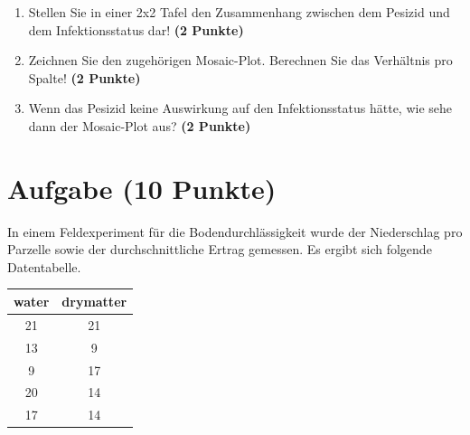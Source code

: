 \documentclass[a4paper, 10pt]{scrartcl}\usepackage[]{graphicx}\usepackage[]{xcolor}
\begin{document}
\begin{enumerate}
\item Stellen Sie in einer 2x2 Tafel den Zusammenhang zwischen dem
  Pesizid und dem Infektionsstatus dar! \textbf{(2 Punkte)}
\item Zeichnen Sie den zugeh{\"o}rigen Mosaic-Plot. Berechnen Sie das
  Verh{\"a}ltnis pro Spalte! \textbf{(2 Punkte)}
\item Wenn das Pesizid keine Auswirkung auf den Infektionsstatus h{\"a}tte, wie
  sehe dann der Mosaic-Plot aus? \textbf{(2 Punkte)}
\end{enumerate} 
\clearpage

\section{Aufgabe \hfill (10 Punkte)}

In einem Feldexperiment f{\"u}r die Bodendurchl{\"a}ssigkeit wurde der Niederschlag
pro Parzelle sowie der durchschnittliche Ertrag gemessen. Es ergibt sich
folgende Datentabelle. 

\begin{table}[!h]
\centering
\begin{tabular}{cc}
\toprule
water & drymatter\\
\midrule
21 & 21\\
13 & 9\\
9 & 17\\
20 & 14\\
17 & 14\\
\bottomrule
\end{tabular}
\end{table}
\end{document}
